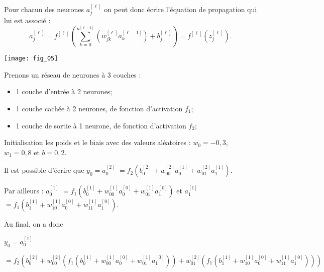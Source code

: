 \begin{defi}

Pour chacun des neurones $a_j^{[\ell]}$ on peut donc écrire l'équation de propagation qui lui est associé : 
$$
a_j^{[\ell]} = f^{[\ell]}\left(\sum\limits_{k=0}^{n^{[\ell-1]}}\left( w^{[\ell]}_{jk} a_k^{[\ell-1]} \right) + b^{[\ell]}_{j}\right) = f^{[\ell]}\left(z_j^{[\ell]}\right).
$$

\end{defi}


\begin{marginfigure}
\texttt{[image: fig\_05]}
\end{marginfigure}

\begin{exemple}

Prenons un réseau de neurones à 3 couches : 
\begin{itemize}
\item 1 couche d'entrée à 2 neurones;
\item 1 couche cachée à 2 neurones, de fonction d'activation $f_1$;
\item 1 couche de sortie à 1 neurone, de fonction d'activation $f_2$; 
\end{itemize}

Initialisation les poids et le biais avec des valeurs aléatoires : $w_0 = -0,3$, $w_1 = 0,8$ et $b=0,2$.

%

Il est possible d'écrire que 
$y_0 = a_0^{[2]}$ 
$ = f_2\left(b_0^{[2]}+ w_{00}^{[2]} a_0^{[1]}+ w_{01}^{[2]} a_1^{[1]}\right)$.

Par ailleurs : 
 $  a_0^{[1]}$ 
$ = f_1\left(b_0^{[1]}+ w_{00}^{[1]} a_0^{[0]}+ w_{01}^{[1]} a_1^{[0]}\right)$ et
  $  a_1^{[1]}$ 
$ = f_1\left(b_1^{[1]}+ w_{10}^{[1]} a_0^{[0]}+ w_{11}^{[1]} a_1^{[0]}\right)$.

Au final, on a donc 

$y_0 = a_0^{[1]}$

$ =  f_2\left(b_0^{[2]}+ w_{00}^{[2]}\left(f_1\left(b_0^{[1]}+ w_{00}^{[1]} a_0^{[0]}+ w_{01}^{[1]} a_1^{[0]}\right)\right)+ w_{01}^{[2]} \left( f_1\left(b_1^{[1]}+ w_{10}^{[1]} a_0^{[0]}+ w_{11}^{[1]} a_1^{[0]}\right)\right)\right) $ 


\end{exemple}

